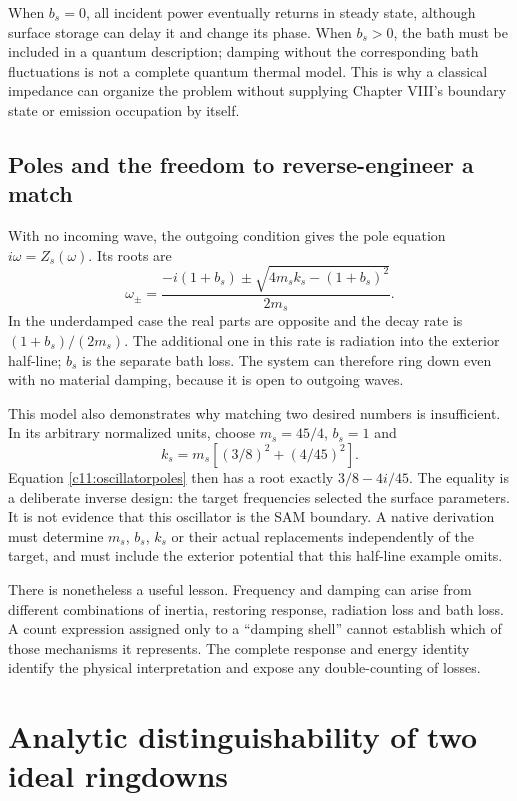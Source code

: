 When $b_s=0$, all incident power eventually returns in steady state, although surface storage can delay it and change its phase. When $b_s>0$, the bath must be included in a quantum description; damping without the corresponding bath fluctuations is not a complete quantum thermal model. This is why a classical impedance can organize the problem without supplying Chapter VIII's boundary state or emission occupation by itself.

\subsection{Poles and the freedom to reverse-engineer a match}
With no incoming wave, the outgoing condition gives the pole equation $i\omega=Z_s(\omega)$. Its roots are
\begin{equation}
 \omega_\pm=
 \frac{-i(1+b_s)\pm\sqrt{4m_sk_s-(1+b_s)^2}}{2m_s}.
 \label{c11:oscillatorpoles}
\end{equation}
In the underdamped case the real parts are opposite and the decay rate is $(1+b_s)/(2m_s)$. The additional one in this rate is radiation into the exterior half-line; $b_s$ is the separate bath loss. The system can therefore ring down even with no material damping, because it is open to outgoing waves.

This model also demonstrates why matching two desired numbers is insufficient. In its arbitrary normalized units, choose $m_s=45/4$, $b_s=1$ and
\begin{equation}
 k_s=m_s\left[(3/8)^2+(4/45)^2\right].
 \label{c11:inversechoice}
\end{equation}
Equation \eqref{c11:oscillatorpoles} then has a root exactly $3/8-4i/45$. The equality is a deliberate inverse design: the target frequencies selected the surface parameters. It is not evidence that this oscillator is the SAM boundary. A native derivation must determine $m_s$, $b_s$, $k_s$ or their actual replacements independently of the target, and must include the exterior potential that this half-line example omits.

There is nonetheless a useful lesson. Frequency and damping can arise from different combinations of inertia, restoring response, radiation loss and bath loss. A count expression assigned only to a ``damping shell'' cannot establish which of those mechanisms it represents. The complete response and energy identity identify the physical interpretation and expose any double-counting of losses.

\section{Analytic distinguishability of two ideal ringdowns}

